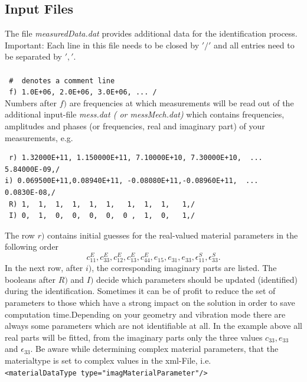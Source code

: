 \subsection{Input Files}
The file  {\em measuredData.dat} provides additional data for the identification
process. 
Important: Each line in this file needs to be closed by $'/'$ and all entries
need to be separated by $','$.\\ \\
\verb! #  denotes a comment line !\\
\verb! f) 1.0E+06, 2.0E+06, 3.0E+06, ... / ! \\
Numbers after $f)$ are frequencies at which measurements will be read out of the
additional input-file {\it mess.dat  ( or messMech.dat)} which contains
frequencies, amplitudes and phases (or frequencies, real and imaginary part) of
your measurements, e.g. \\
\noindent 
\begin{verbatim}
 r) 1.32000E+11, 1.150000E+11, 7.10000E+10, 7.30000E+10,  ...
5.84000E-09,/ 
i) 0.069500E+11,0.08940E+11, -0.08080E+11,-0.08960E+11,  ...
0.0830E-08,/
 R) 1,  1,  1,  1,  1,  1,   1,  1,  1,   1,/
 I) 0,  1,  0,  0,  0,  0,  0 ,  1,  0,   1,/
\end{verbatim}
\noindent The row $r)$ contains initial guesses for the real-valued material
parameters in the following order\\ $$c_{11}^E, c_{33}^E, c_{12}^E, c_{13}^E,
c_{44}^E, e_{15}, e_{31}, e_{33}, \epsilon_{11}^S, \epsilon_{33}^S.$$ In the
next row, after $i)$, the corresponding imaginary parts are listed. The booleans
after $R)$ and $I)$ decide which parameters should be updated (identified)
during the identification. Sometimes it can be of profit to reduce the set of
parameters to those which have a strong impact on the solution in order to save
computation time.Depending on your geometry and vibration mode there are always
some parameters which are not identifiable at all. In the example above all real
parts will be fitted, from the imaginary parts only the three values
$c_{33},e_{33}$ and $\epsilon_{33}$. Be aware while determining complex material
parameters, that the materialtype is set to complex values in the xml-File,
i.e.\\ \noindent \verb!<materialDataType type="imagMaterialParameter"/>! \\
\noindent 


